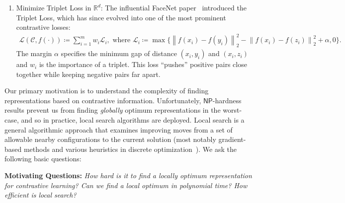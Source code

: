 \documentclass{article}
\theoremstyle{definition}  %
\theoremstyle{plain}
\numberwithin{observation}{section}
\numberwithin{claim}{section}
\numberwithin{fact}{section}
\numberwithin{lemma}{section}
\numberwithin{proposition}{section}
\numberwithin{theorem}{section}
\numberwithin{corollary}{section}
\numberwithin{definition}{section}
\newcommand{\lnorm}{\left\lVert}
\newcommand{\rnorm}{\right\rVert}
\newcommand{\x}{x}
\newcommand{\y}{y}
\newcommand{\z}{z}
\newcommand{\anc}{\x}
\newcommand{\pos}{\y}
\renewcommand{\neg}{\z}
\theoremstyle{plain}
\begin{document}
\begin{enumerate}[leftmargin=*]
    \item \label{obj3} Minimize Triplet Loss in $\mathbb{R}^d$: %
    The influential FaceNet paper~\citep{schroff2015facenet} introduced the Triplet Loss, which has since evolved into one of the most prominent contrastive losses:
    \begin{align*}
    \mathcal{L}(\mathcal{C},f(\cdot)) \coloneqq \sum_{i=1}^m w_i \mathcal{L}_i, \text{ where } 
    \mathcal{L}_i \coloneqq \max \{\lnorm f(x_i)-f(y_i)\rnorm_2^2 - \lnorm f(x_i)-f(z_i)\rnorm_2^2 + \alpha, 0\}.
    \end{align*}
    The margin  $\alpha$ specifies the minimum gap of distance $(x_i,y_i)$ and $(x_i,z_i)$ and $w_i$ is the importance of a triplet. This loss ``pushes'' positive pairs close together while keeping negative pairs far apart.
\end{enumerate}

Our primary motivation is to understand the complexity of finding representations based on contrastive information. Unfortunately, $\mathsf{NP}$-hardness results prevent us from finding \textit{globally} optimum representations in the worst-case, and so in practice, local search algorithms are deployed. Local search is a general algorithmic approach that examines improving moves from a set of allowable nearby configurations to the current solution (most notably gradient-based methods and various heuristics in discrete optimization~\citep{orlin2004approximate}). We ask the following basic questions: 
\begin{center}
\textbf{Motivating Questions: }\textit{How hard is it to find a \emph{locally optimum} representation for contrastive learning? Can we find a local optimum in polynomial time? How efficient is local search?}
\end{center}
\end{document}
